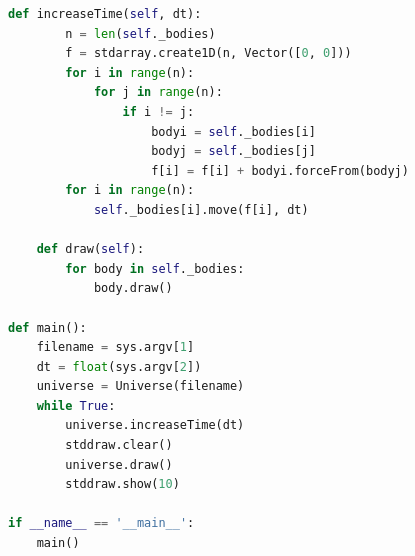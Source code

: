 \documentclass[8pt,a4paper,compress,handout]{beamer}
\begin{document}
\begin{frame}[fragile]
\begin{lstlisting}[language=Python]
    def increaseTime(self, dt):
        n = len(self._bodies)
        f = stdarray.create1D(n, Vector([0, 0]))
        for i in range(n):
            for j in range(n):
                if i != j:
                    bodyi = self._bodies[i]
                    bodyj = self._bodies[j]
                    f[i] = f[i] + bodyi.forceFrom(bodyj)
        for i in range(n):
            self._bodies[i].move(f[i], dt)    

    def draw(self):
        for body in self._bodies:
            body.draw()

def main():
    filename = sys.argv[1]
    dt = float(sys.argv[2])
    universe = Universe(filename)
    while True:
        universe.increaseTime(dt)
        stddraw.clear()
        universe.draw()
        stddraw.show(10)

if __name__ == '__main__':
    main()
\end{lstlisting}
\end{frame}
\end{document}
